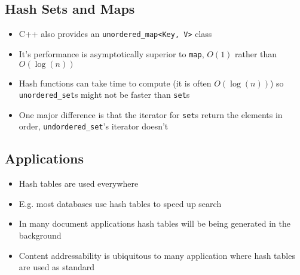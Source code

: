 
\begin{slide}
\section[-1]{Hash Sets and Maps}

\begin{PauseHighLight}
  \begin{itemize}
  \item C++ also provides an \texttt{unordered\_map<Key, V>} class
  \item It's performance is asymptotically superior to \texttt{map},
    $O(1)$ rather than $O(\log(n))$\pause
  \item Hash functions can take time to compute (it is often
    $O(\log(n))$) so \texttt{unordered\_set}s might not be faster than
    \texttt{set}s\pause
  \item One major difference is that the iterator for \texttt{set}s
    return the elements in order, \texttt{undordered\_set}'s iterator
    doesn't\pause 
  \end{itemize}
\end{PauseHighLight}

\end{slide}



\begin{slide}
\section{Applications}

\begin{PauseHighLight}
  \begin{itemize}
  \item Hash tables are used everywhere\pause
  \item E.g. most databases use hash tables to speed up search\pause
  \item In many document applications hash tables will be being
    generated in the background\pause
  \item Content addressability is ubiquitous to many application where
    hash tables are used as standard\pause
  \end{itemize}
\end{PauseHighLight}

\end{slide}

